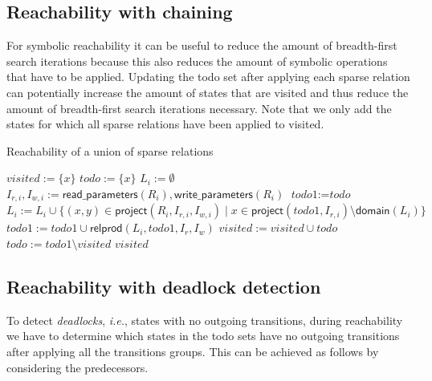 \documentclass{article}
\newcommand{\var}[1]{\ensuremath{\textit{#1}}}
\begin{document}
\newpage
\subsection{Reachability with chaining}

For symbolic reachability it can be useful to reduce the amount of breadth-first search iterations because this also reduces the amount of symbolic operations that have to be applied.
Updating the todo set after applying each sparse relation can potentially increase the amount of states that are visited and thus reduce the amount of breadth-first search iterations necessary.
Note that we only add the states for which all sparse relations have been applied to visited.

\begin{algorithm}[H]
\caption{Reachability of a union of sparse relations}
\label{alg:reachability_with_chaining}
\begin{algorithmic}[1]
\State $\var{visited} := \{ x \}$
\State $\var{todo} := \{ x \}$
    \State $L_i := \emptyset$
    \State $I_{r,i}, I_{w,i} := \textsf{read\_parameters}(R_i), \textsf{write\_parameters}(R_i)$
\EndFor
\While {$\var{todo} \neq \emptyset$}
    \State $\var{todo1} := \var{todo}$
        \State $L_i := L_i \cup \{ (x,y) \in \textsf{project}(R_i, I_{r,i}, I_{w,i}) \mid x \in \textsf{project}(\var{todo1}, I_{r,i})  \setminus \textsf{domain}(L_i) \}$
        \State $\var{todo1} := \var{todo1} \cup \textsf{relprod}(L_i, \var{todo1}, I_r, I_w)$
    \EndFor
    \State $\var{visited} := \var{visited} \cup \var{todo}$
    \State $\var{todo} := \var{todo1} \setminus \var{visited}$
\EndWhile
\State \Return \var{visited}
\EndFunction
\end{algorithmic}
\end{algorithm}

\subsection{Reachability with deadlock detection}

To detect \emph{deadlocks}, \emph{i.e.}, states with no outgoing transitions, during reachability we have to determine which states in the todo sets have no outgoing transitions after applying all the transitions groups.
This can be achieved as follows by considering the predecessors.
\end{document}
